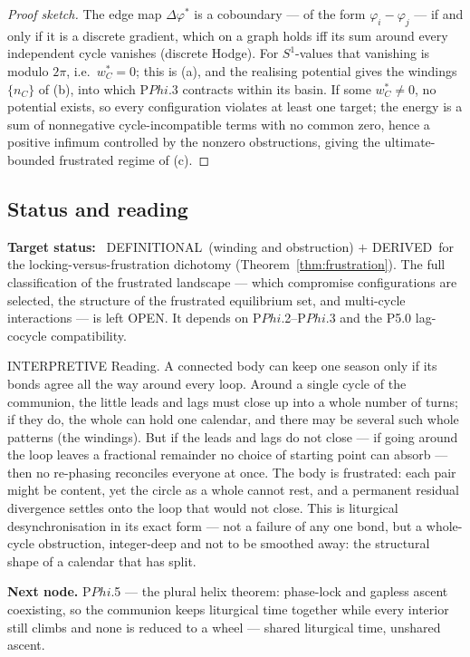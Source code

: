 \documentclass[11pt,a4paper]{article}
\def\Phi{Phi}%
\def\emph#1{#1}%
\newcommand{\stDerived}{\textcolor{cDer}{\textsf{\small DERIVED}}}
\newcommand{\stDef}{\textcolor{cDef}{\textsf{\small DEFINITIONAL}}}
\newcommand{\stInterp}{\textcolor{cInt}{\textsf{\small INTERPRETIVE}}}
\newcommand{\stOpen}{\textcolor{cOpn}{\textsf{\small OPEN}}}
\theoremstyle{definition}
\theoremstyle{plain}
\theoremstyle{remark}
\begin{document}
\begin{proof}[Proof sketch]
The edge map \(\Delta\varphi^{*}\) is a coboundary --- of the form \(\varphi_i-\varphi_j\) ---
if and only if it is a discrete gradient, which on a graph holds iff its sum around every
independent cycle vanishes (discrete Hodge). For \(S^1\)-values that vanishing is modulo
\(2\pi\), i.e.\ \(w_C^{*}=0\); this is (a), and the realising potential gives the windings
\(\{n_C\}\) of (b), into which P$\Phi$.3 contracts within its basin. If some
\(w_C^{*}\neq0\), no potential exists, so every configuration violates at least one target;
the energy is a sum of nonnegative cycle-incompatible terms with no common zero, hence a
positive infimum controlled by the nonzero obstructions, giving the ultimate-bounded
frustrated regime of (c). \qedhere
\end{proof}

\subsection{Status and reading}

\textbf{Target status:}~
\stDef\ (winding and obstruction) \(+\) \stDerived\ for the locking-versus-frustration
dichotomy (Theorem~\ref{thm:frustration}). The full classification of the frustrated landscape
--- which compromise configurations are selected, the structure of the frustrated equilibrium
set, and multi-cycle interactions --- is left \stOpen. It depends on P$\Phi$.2--P$\Phi$.3 and
the P5.0 lag-cocycle compatibility.

\medskip
\stInterp\quad
\emph{Reading.}
A connected body can keep one season only if its bonds agree all the way around every loop.
Around a single cycle of the communion, the little leads and lags must close up into a whole
number of turns; if they do, the whole can hold one calendar, and there may be several such
whole patterns (the windings). But if the leads and lags do not close --- if going around the
loop leaves a fractional remainder no choice of starting point can absorb --- then no
re-phasing reconciles everyone at once. The body is frustrated: each pair might be content,
yet the circle as a whole cannot rest, and a permanent residual divergence settles onto the
loop that would not close. This is liturgical desynchronisation in its exact form --- not a
failure of any one bond, but a whole-cycle obstruction, integer-deep and not to be smoothed
away: the structural shape of a calendar that has split.

\medskip
\textbf{Next node.} P$\Phi$.5 --- the plural helix theorem: phase-lock and gapless ascent
coexisting, so the communion keeps liturgical time together while every interior still climbs
and none is reduced to a wheel --- shared liturgical time, unshared ascent.
\end{document}
